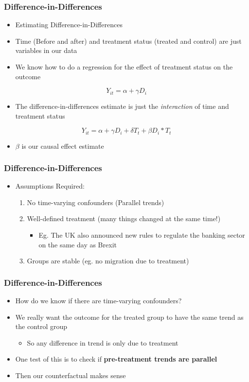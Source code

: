 \documentclass[xcolor=x11names,compress]{beamer}\usepackage[]{graphicx}\usepackage[]{color}
\renewcommand{\(}{\begin{columns}}
\renewcommand{\)}{\end{columns}}
\newcommand{\<}[1]{\begin{column}{#1}}
\renewcommand{\>}{\end{column}}
\begin{document}
\begin{frame}
\frametitle{Difference-in-Differences}
\begin{itemize}
\item Estimating Difference-in-Differences
\pause
\item Time (Before and after) and treatment status (treated and control) are just variables in our data
\pause
\item We know how to do a regression for the effect of treatment status on the outcome
\end{itemize}
$$ Y_{it} = \alpha + \gamma D_i$$
\pause
\begin{itemize}
\item The difference-in-differences estimate is just the \textit{interaction} of time and treatment status
\end{itemize}
$$ Y_{it} = \alpha + \gamma D_i + \delta T_t + \beta D_i * T_t $$
\begin{itemize}
\item $\beta$ is our causal effect estimate
\end{itemize}
\end{frame}

\begin{frame}
\frametitle{Difference-in-Differences}
\begin{itemize}
\item Assumptions Required:
\begin{enumerate}
\item No time-varying confounders (Parallel trends)
\item Well-defined treatment (many things changed at the same time!)
\begin{itemize}
\item Eg. The UK also announced new rules to regulate the
banking sector on the same day as Brexit
\end{itemize}
\item Groups are stable (eg. no migration due to treatment)
\end{enumerate}
\end{itemize}
\end{frame}

\begin{frame}
\frametitle{Difference-in-Differences}
\begin{itemize}
\item How do we know if there are time-varying confounders?
\pause
\item We really want the outcome for the treated group to have the same trend as the control group
\pause
\begin{itemize}
\item So any difference in trend is only due to treatment
\pause
\end{itemize}
\item One test of this is to check if \textbf{pre-treatment trends are parallel}
\pause
\item Then our counterfactual makes sense
\end{itemize}
\end{frame}
\end{document}
